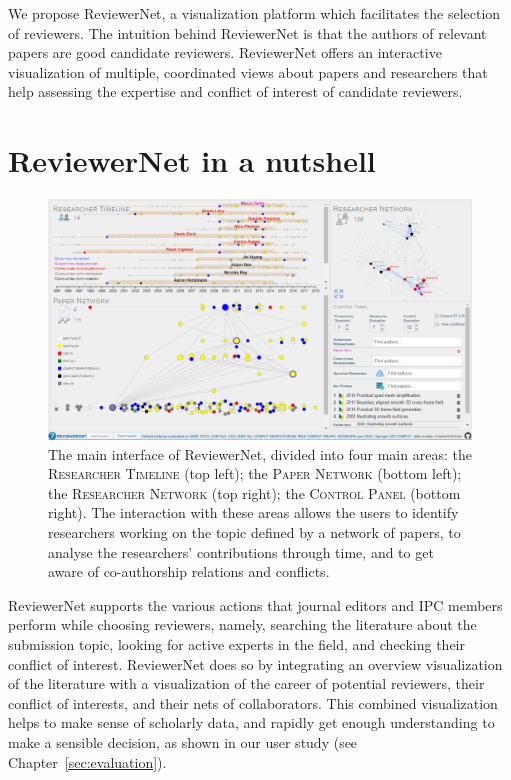 We propose ReviewerNet, a visualization platform which facilitates the selection of reviewers. The intuition behind ReviewerNet is that the authors of relevant papers are good candidate reviewers. ReviewerNet offers an interactive visualization of multiple, coordinated views about papers and researchers that help assessing the expertise and conflict of interest of candidate reviewers.

\section{ReviewerNet in a nutshell}

\begin{figure}[t]
\centering
\includegraphics[width=\textwidth]{fig/teaser_colormap2.png}
\caption{The main interface of ReviewerNet, divided into four main areas: the \textsc{Researcher Timeline } (top left); the \textsc{Paper Network }(bottom left); the \textsc{Researcher Network } (top right); the \textsc{Control Panel } (bottom right). The interaction with these areas allows the users to identify researchers working on the topic defined by a network of papers, to analyse the researchers' contributions through time, and to get aware of co-authorship relations and conflicts.}
\label{fig:interface}
\end{figure}

ReviewerNet supports the various actions that journal editors and IPC members perform while choosing reviewers, namely, searching the literature about the submission topic, looking for active experts in the field, and checking their conflict of interest. ReviewerNet does so by integrating an overview visualization of the literature with a visualization of the career of potential reviewers, their conflict of interests, and their nets of collaborators. This combined visualization helps to make sense of scholarly data, and rapidly get enough understanding to make a sensible decision, as shown in our user study (see Chapter~\ref{sec:evaluation}). 

